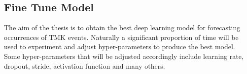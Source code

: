\subsection{Fine Tune Model}
The aim of the thesis is to obtain the best deep learning model for forecasting occurrences of TMK events. Naturally a significant proportion of time will be used to experiment and adjust hyper-parameters to produce the best model. Some hyper-parameters that will be adjusted accordingly include learning rate, dropout, stride, activation function and many others.



